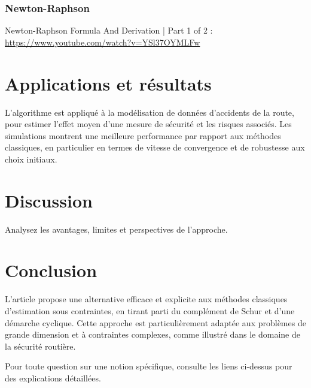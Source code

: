 \documentclass[12pt,a4paper]{article}
\begin{document}
	\subsubsection{Newton-Raphson} %
	Newton-Raphson Formula And Derivation | Part 1 of 2 : \url{https://www.youtube.com/watch?v=YSl37OYMLFw}
	
	
	\section{Applications et résultats} %
	L’algorithme est appliqué à la modélisation de données d’accidents de la route, pour estimer l’effet moyen d’une mesure de sécurité et les risques associés.
	Les simulations montrent une meilleure performance par rapport aux méthodes classiques, en particulier en termes de vitesse de convergence et de robustesse aux choix initiaux.
	
	\section{Discussion} %
	Analysez les avantages, limites et perspectives de l’approche.
	
	\section{Conclusion} %
	L’article propose une alternative efficace et explicite aux méthodes classiques d’estimation sous contraintes, en tirant parti du complément de Schur et d’une démarche cyclique. Cette approche est particulièrement adaptée aux problèmes de grande dimension et à contraintes complexes, comme illustré dans le domaine de la sécurité routière.
	
	Pour toute question sur une notion spécifique, consulte les liens ci-dessus pour des explications détaillées.
	
\end{document}
